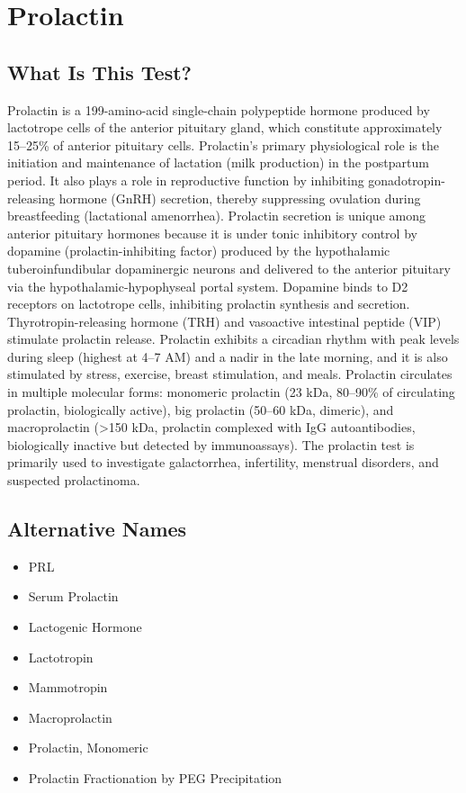 \chapter{Prolactin}

\section*{What Is This Test?}
Prolactin is a 199-amino-acid single-chain polypeptide hormone produced by lactotrope cells of the anterior pituitary gland, which constitute approximately 15--25\% of anterior pituitary cells. Prolactin's primary physiological role is the initiation and maintenance of lactation (milk production) in the postpartum period. It also plays a role in reproductive function by inhibiting gonadotropin-releasing hormone (GnRH) secretion, thereby suppressing ovulation during breastfeeding (lactational amenorrhea). Prolactin secretion is unique among anterior pituitary hormones because it is under tonic inhibitory control by dopamine (prolactin-inhibiting factor) produced by the hypothalamic tuberoinfundibular dopaminergic neurons and delivered to the anterior pituitary via the hypothalamic-hypophyseal portal system. Dopamine binds to D2 receptors on lactotrope cells, inhibiting prolactin synthesis and secretion. Thyrotropin-releasing hormone (TRH) and vasoactive intestinal peptide (VIP) stimulate prolactin release. Prolactin exhibits a circadian rhythm with peak levels during sleep (highest at 4--7 AM) and a nadir in the late morning, and it is also stimulated by stress, exercise, breast stimulation, and meals. Prolactin circulates in multiple molecular forms: monomeric prolactin (23 kDa, 80--90\% of circulating prolactin, biologically active), big prolactin (50--60 kDa, dimeric), and macroprolactin (>150 kDa, prolactin complexed with IgG autoantibodies, biologically inactive but detected by immunoassays). The prolactin test is primarily used to investigate galactorrhea, infertility, menstrual disorders, and suspected prolactinoma.

\section*{Alternative Names}
\begin{itemize}
  \item PRL
  \item Serum Prolactin
  \item Lactogenic Hormone
  \item Lactotropin
  \item Mammotropin
  \item Macroprolactin
  \item Prolactin, Monomeric
  \item Prolactin Fractionation by PEG Precipitation
\end{itemize}
